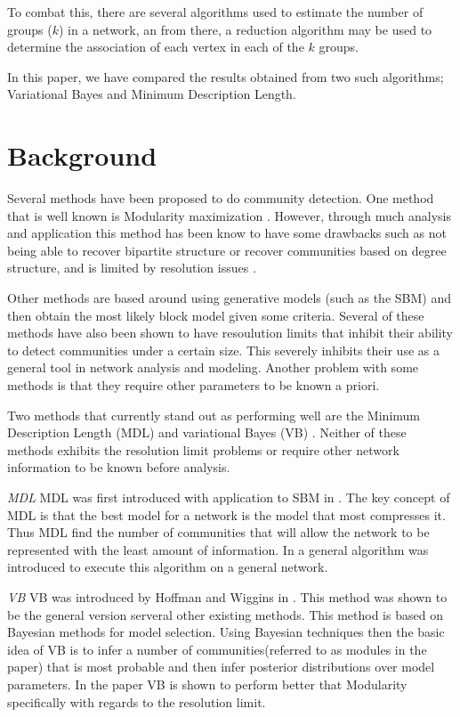 \documentclass[twocolumn,twoside]{IEEEtran}
\begin{document}
To combat this, there are several algorithms used to estimate the number of groups ($k$)
in a network, an from there, a reduction algorithm may be used to determine the association
of each vertex in each of the $k$ groups.

In this paper, we have compared the results obtained from two such algorithms;
Variational Bayes and Minimum Description Length.

\section*{Background}\label{sec:Background}
Several methods have been proposed to do community detection. One method that is well known is Modularity maximization \cite{Newman2004}. However, through much analysis and application this method has been know to have some drawbacks such as not being able to recover bipartite structure \cite{Peixoto2013} or recover communities based on degree structure, and is limited by resolution issues \cite{fortunato2007resolution}.

Other methods are based around using generative models (such as the SBM) and then obtain the most likely block model given some criteria. Several of these methods have also been shown to have resoulution limits\cite{fortunato2007resolution} that inhibit their ability to detect communities under a certain size. This severely inhibits their use as a general tool in network analysis and modeling. Another problem with some methods is that they require other parameters to be known a priori.

Two methods that currently stand out as performing well are the Minimum Description Length (MDL) \cite{Peixoto2013} and variational Bayes (VB) \cite{Hofman2008}. Neither of these methods exhibits the resolution limit problems or require other network information to be known before analysis.

\emph{MDL}
MDL was first introduced with application to SBM in \cite{Rosvall2007}. The key concept of MDL is that the best model for a network is the model that most compresses it. Thus MDL find the number of communities that will allow the network to be represented with the least amount of information. In \cite{Peixoto2013} a general algorithm was introduced to execute this algorithm on a general network.

\emph{VB}
VB was introduced by Hoffman and Wiggins in \cite{Hoffman2008}. This method was shown to be the general version serveral other existing methods. This method is based on Bayesian methods for model selection. Using Bayesian techniques then the basic idea of VB is to infer a number of communities(referred to as modules in the paper) that is most probable and then infer posterior distributions over model parameters. In the paper VB is shown to perform better that Modularity specifically with regards to the resolution limit.
\end{document}

